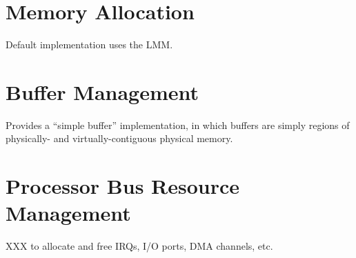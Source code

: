 \section{Memory Allocation}

Default implementation uses the LMM.

\section{Buffer Management}

Provides a ``simple buffer'' implementation,
in which buffers are simply regions
of physically- and virtually-contiguous physical memory.

\section{Processor Bus Resource Management}

XXX to allocate and free IRQs, I/O ports, DMA channels, etc.


